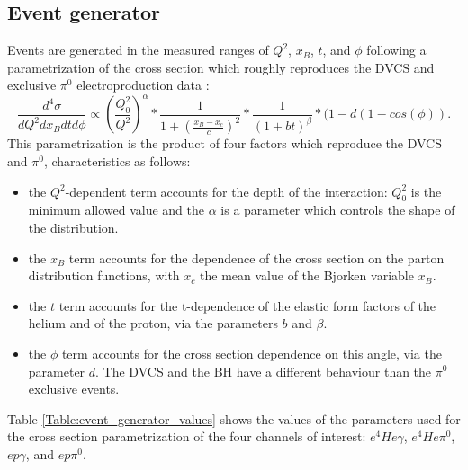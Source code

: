 \subsection{Event generator} \label{Event_generator}
Events are generated in the measured ranges of $Q^{2}$, $x_{B}$, $t$, and 
$\phi$ following a parametrization of the cross section which roughly 
reproduces the DVCS and exclusive $\pi^{0}$ electroproduction data 
\cite{FX_thesis}:
\begin{equation}
\frac{d^{4}\sigma}{dQ^{2}dx_{B}dtd\phi} \propto \left(\frac{Q^{2}_{0}}{Q^{2}}\right)^{\alpha} *  \frac{1}{1 + (\frac{x_{B} - x_{c}}{c})^{2}} * \frac{1}{(1+bt)^{\beta}} * (1-d(1-cos(\phi)).
\label{equ:event_generator}
\end{equation}
This parametrization is the product of four factors which reproduce the DVCS and $\pi^{0}$,  characteristics as follows:
\begin{itemize}
\item the $Q^{2}$-dependent term accounts for the depth of the interaction: $Q^{2}_{0}$ is the minimum allowed value and the $\alpha$ is a parameter which controls the shape of the distribution.   
\item the $x_{B}$ term accounts for the dependence of the cross section on the parton distribution functions, with $x_{c}$ the mean value of the Bjorken variable $x_{B}$.
\item the $t$ term accounts for the t-dependence of the elastic form factors of the helium and of the proton, via the parameters $b$ and $\beta$.
\item the $\phi$ term accounts for the cross section dependence on this angle, via the parameter $d$. The DVCS and the BH have a different behaviour than the $\pi^{0}$ exclusive events. 
\end{itemize}

Table \ref{Table:event_generator_values} shows the values of the parameters used for the cross section parametrization of the four channels of interest: $e^{4}He\gamma$, $e^{4}He\pi^{0}$, $ep\gamma$, and $ep\pi^{0}$.

